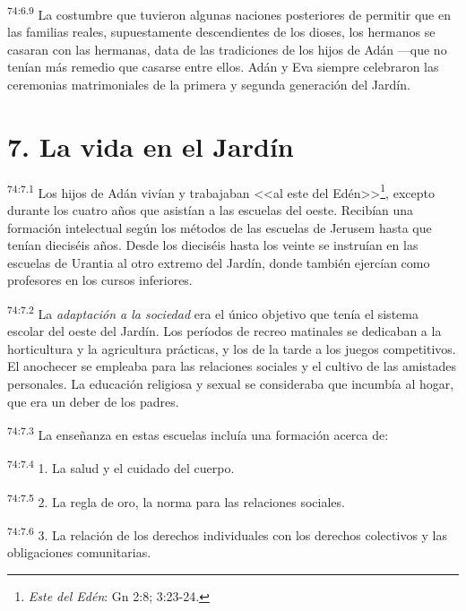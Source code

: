 \par
\textsuperscript{74:6.9} La costumbre que tuvieron algunas naciones posteriores de permitir que en las familias reales, supuestamente descendientes de los dioses, los hermanos se casaran con las hermanas, data de las tradiciones de los hijos de Adán ---que no tenían más remedio que casarse entre ellos. Adán y Eva siempre celebraron las ceremonias matrimoniales de la primera y segunda generación del Jardín.

\section*{7. La vida en el Jardín}
\par
\textsuperscript{74:7.1} Los hijos de Adán vivían y trabajaban <<al este del Edén>>\footnote{\textit{Este del Edén}: Gn 2:8; 3:23-24.}, excepto durante los cuatro años que asistían a las escuelas del oeste. Recibían una formación intelectual según los métodos de las escuelas de Jerusem hasta que tenían dieciséis años. Desde los dieciséis hasta los veinte se instruían en las escuelas de Urantia al otro extremo del Jardín, donde también ejercían como profesores en los cursos inferiores.

\par
\textsuperscript{74:7.2} La \textit{adaptación a la sociedad} era el único objetivo que tenía el sistema escolar del oeste del Jardín. Los períodos de recreo matinales se dedicaban a la horticultura y la agricultura prácticas, y los de la tarde a los juegos competitivos. El anochecer se empleaba para las relaciones sociales y el cultivo de las amistades personales. La educación religiosa y sexual se consideraba que incumbía al hogar, que era un deber de los padres.

\par
\textsuperscript{74:7.3} La enseñanza en estas escuelas incluía una formación acerca de:

\par
\textsuperscript{74:7.4} 1. La salud y el cuidado del cuerpo.

\par
\textsuperscript{74:7.5} 2. La regla de oro, la norma para las relaciones sociales.

\par
\textsuperscript{74:7.6} 3. La relación de los derechos individuales con los derechos colectivos y las obligaciones comunitarias.


